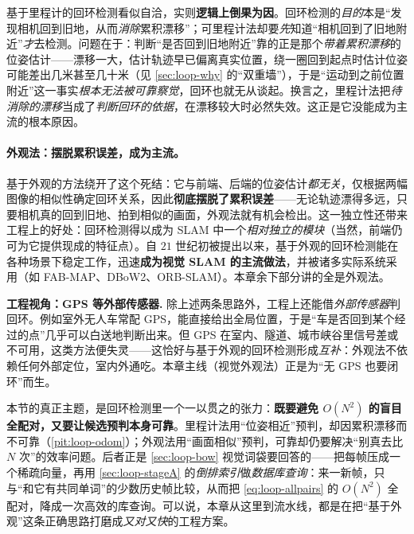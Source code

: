 \begin{pitfall}\label{pit:loop-odom}
基于里程计的回环检测看似自洽，实则\textbf{逻辑上倒果为因}\cite{gaoxiang2019slam14}。回环检测的\emph{目的}本是“发现相机回到旧地，从而\emph{消除}累积漂移”；可里程计法却要\emph{先}知道“相机回到了旧地附近”\emph{才}去检测。问题在于：判断“是否回到旧地附近”靠的正是那个\emph{带着累积漂移}的位姿估计——漂移一大，估计轨迹早已偏离真实位置，绕一圈回到起点时估计位姿可能差出几米甚至几十米（见 \cref{sec:loop-why} 的“双重墙”），于是“运动到之前位置附近”这一事实\emph{根本无法被可靠察觉}，回环也就无从谈起。换言之，里程计法把\emph{待消除的漂移}当成了\emph{判断回环的依据}，在漂移较大时必然失效\cite{cummins2008fabmap}。这正是它没能成为主流的根本原因。
\end{pitfall}

\paragraph{外观法：摆脱累积误差，成为主流。}
基于外观的方法绕开了这个死结\cite{gaoxiang2019slam14}：它与前端、后端的位姿估计\emph{都无关}，仅根据两幅图像的相似性确定回环关系，因此\textbf{彻底摆脱了累积误差}——无论轨迹漂得多远，只要相机真的回到旧地、拍到相似的画面，外观法就有机会检出。这一独立性还带来工程上的好处：回环检测得以成为 SLAM 中一个\emph{相对独立的模块}（当然，前端仍可为它提供现成的特征点）。自 $21$ 世纪初被提出以来，基于外观的回环检测能在各种场景下稳定工作，迅速\textbf{成为视觉 SLAM 的主流做法}，并被诸多实际系统采用（如 FAB-MAP\cite{cummins2008fabmap}、DBoW2\cite{galvez2012bags}、ORB-SLAM\cite{murartal2015orbslam}）。本章余下部分讲的全是外观法。

\begin{note}
\textbf{工程视角：GPS 等外部传感器.}\;
除上述两条思路外，工程上还能借\emph{外部传感器}判回环\cite{gaoxiang2019slam14}。例如室外无人车常配 GPS，能直接给出全局位置，于是“车是否回到某个经过的点”几乎可以白送地判断出来。但 GPS 在室内、隧道、城市峡谷里信号差或不可用，这类方法便失灵——这恰好与基于外观的回环检测形成\emph{互补}：外观法不依赖任何外部定位，室内外通吃。本章主线（视觉外观法）正是为“无 GPS 也要闭环”而生。
\end{note}

\begin{insight}\label{ins:loop-prefilter}
本节的真正主题，是回环检测里一个一以贯之的张力：\textbf{既要避免 $O(N^2)$ 的盲目全配对，又要让候选预判本身可靠}。里程计法用“位姿相近”预判，却因累积漂移而不可靠（\cref{pit:loop-odom}）；外观法用“画面相似”预判，可靠却仍要解决“别真去比 $N$ 次”的效率问题。后者正是 \cref{sec:loop-bow} 视觉词袋要回答的——把每帧压成一个稀疏向量，再用 \cref{sec:loop-stageA} 的\emph{倒排索引}做\emph{数据库查询}：来一新帧，只与“和它有共同单词”的少数历史帧比较，从而把 \cref{eq:loop-allpairs} 的 $O(N^2)$ 全配对，降成一次高效的库查询。可以说，本章从这里到流水线，都是在把“基于外观”这条正确思路打磨成\emph{又对又快}的工程方案。
\end{insight}


